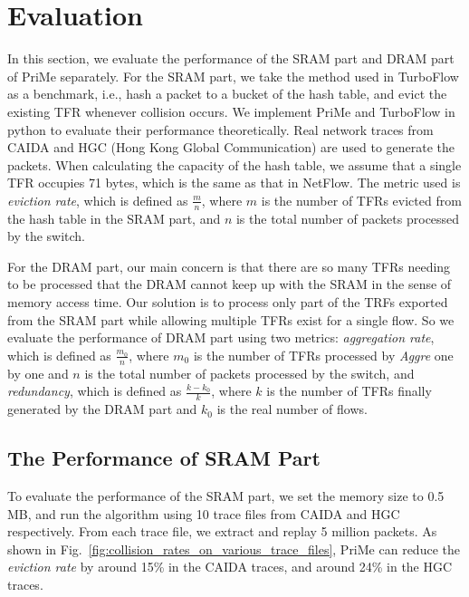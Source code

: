 \documentclass[10pt, conference, letterpaper]{IEEEtran}
\begin{document}
\section{Evaluation}
In this section, we evaluate the performance of the SRAM part and DRAM part of PriMe separately. For the SRAM part, we take the method used in TurboFlow\cite{sonchack_turboflow:_2018} as a benchmark, i.e., hash a packet to a bucket of the hash table, and evict the existing TFR whenever collision occurs. We implement PriMe and TurboFlow in python to evaluate their performance theoretically. Real network traces from CAIDA and HGC (Hong Kong Global Communication) are used to generate the packets. When calculating the capacity of the hash table, we assume that a single TFR occupies 71 bytes, which is the same as that in NetFlow. The metric used is \emph{eviction rate}, which is defined as $\frac{m}{n}$, where $m$ is the number of TFRs evicted from the hash table in the SRAM part, and $n$ is the total number of packets processed by the switch.

For the DRAM part, our main concern is that there are so many TFRs needing to be processed that the DRAM cannot keep up with the SRAM in the sense of memory access time. Our solution is to process only part of the TRFs exported from the SRAM part while allowing multiple TFRs exist for a single flow. So we evaluate the performance of DRAM part using two metrics: \emph{aggregation rate}, which is defined as $\frac{m_0}{n}$, where $m_0$ is the number of TFRs processed by \emph{Aggre} one by one and $n$ is the total number of packets processed by the switch, and \emph{redundancy}, which is defined as $\frac{k - k_0}{k}$, where $k$ is the number of TFRs finally generated by the DRAM part and $k_0$ is the real number of flows.
 
\subsection{The Performance of SRAM Part}
To evaluate the performance of the SRAM part, we set the memory size to 0.5 MB, and run the algorithm using 10 trace files from CAIDA and HGC respectively. From each trace file, we extract and replay 5 million packets. As shown in Fig.~\ref{fig:collision_rates_on_various_trace_files}, PriMe can reduce the \emph{eviction rate} by around 15\% in the CAIDA traces, and around 24\% in the HGC traces. 
\end{document}
